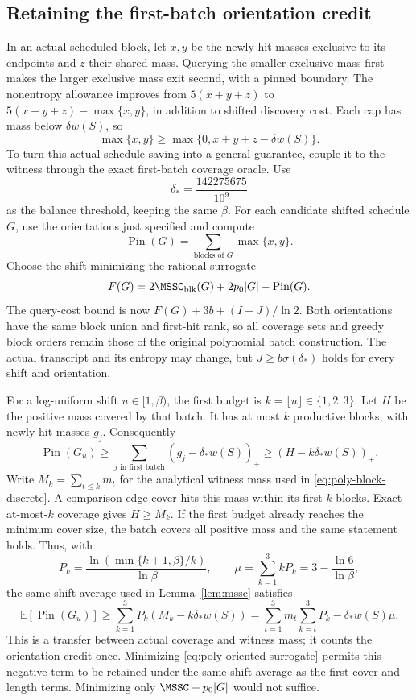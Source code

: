 \subsection{Retaining the first-batch orientation credit}

In an actual scheduled block, let $x,y$ be the newly hit masses
exclusive to its endpoints and $z$ their shared mass. Querying the
smaller exclusive mass first makes the larger exclusive mass exit
second, with a pinned boundary. The nonentropy allowance improves
from $5(x+y+z)$ to $5(x+y+z)-\max\{x,y\}$, in addition to shifted
discovery cost. Each cap has mass below $\delta w(S)$, so
\[
 \max\{x,y\}\ge\max\{0,x+y+z-\delta w(S)\}.
\]
To turn this actual-schedule saving into a general guarantee, couple it
to the witness through the exact first-batch coverage oracle. Use
\[
 \delta_* =\frac{142275675}{10^9}
\]
as the balance threshold, keeping the same $\beta$. For each candidate
shifted schedule $G$, use the orientations just specified and compute
\[
 \operatorname{Pin}(G)=\sum_{\text{blocks of }G}\max\{x,y\}.
\]
Choose the shift minimizing the rational surrogate
\begin{equation}\label{eq:poly-oriented-surrogate}
 F(G)=2\MSSC_{\mathrm{blk}}(G)+2p_0|G|-\operatorname{Pin}(G).
\end{equation}
The query-cost bound is now $F(G)+3b+(I-J)/\ln2$.
Both orientations have the same block union and first-hit rank, so
all coverage sets and greedy block orders remain those of the original
polynomial batch construction. The actual transcript and its entropy
may change, but $J\ge b\sigma(\delta_*)$ holds for every shift and
orientation.

For a log-uniform shift $u\in[1,\beta)$, the first budget is
$k=\lfloor u\rfloor\in\{1,2,3\}$. Let $H$ be the positive mass covered
by that batch. It has at most $k$ productive blocks, with newly hit
masses $g_j$. Consequently
\[
 \operatorname{Pin}(G_u)\ge
 \sum_{j\text{ in first batch}}(g_j-\delta_* w(S))_+
 \ge (H-k\delta_*w(S))_+.
\]
Write $M_k=\sum_{t\le k}m_t$ for the analytical witness mass used
in \eqref{eq:poly-block-discrete}. A comparison edge cover hits this
mass within its first $k$ blocks. Exact at-most-$k$ coverage gives
$H\ge M_k$. If the first budget already reaches the minimum cover size,
the batch covers all positive mass and the same statement holds.
Thus, with
\[
 P_k=\frac{\ln(\min\{k+1,\beta\}/k)}{\ln\beta},\qquad
 \mu=\sum_{k=1}^{3}kP_k=3-\frac{\ln6}{\ln\beta},
\]
the same shift average used in Lemma~\ref{lem:mssc} satisfies
\begin{equation}\label{eq:poly-oriented-transfer}
 \mathbb E[\operatorname{Pin}(G_u)]
 \ge\sum_{k=1}^{3}P_k(M_k-k\delta_*w(S))
 =\sum_{t=1}^{3}m_t\sum_{k=t}^{3}P_k-\delta_*w(S)\mu.
\end{equation}
This is a transfer between actual coverage and witness mass; it counts
the orientation credit once. Minimizing
\eqref{eq:poly-oriented-surrogate} permits this negative term to be
retained under the same shift average as the first-cover and length
terms. Minimizing only $\MSSC+p_0|G|$ would not suffice.

